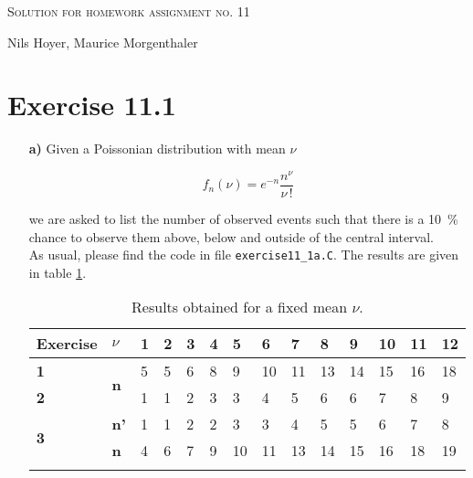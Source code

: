 \documentclass[10pt]{article}
\newenvironment{myfont}{\fontfamily{put}\selectfont}{\par}
\begin{document}
\begin{myfont}

\begin{center}
  \begin{Large}
    \textsc{Solution for homework assignment no. 11} \\
  \end{Large}
  \vspace*{0.4cm}
    Nils Hoyer, Maurice Morgenthaler
  \vspace*{1cm}
\end{center}

\section*{Exercise 11.1}

\begin{itemize}
	\item[\textbf{a)}] Given a Poissonian distribution with mean $\nu$
	
	\begin{equation}
		f_{n}(\nu) = e^{-n}\frac{n^{\nu}}{\nu\,!}
	\end{equation}

	\noindent we are asked to list the number of observed events such that there is a \SI{10}{\percent} chance to observe them above, below and outside of the central interval. \\
	As usual, please find the code in file \texttt{exercise11\_1a.C}.
	The results are given in table \ref{tab:ex1_results_a}.

	\begin{longtable}{*{14}l}
		\endfirsthead
		\endhead
		\toprule
		\textbf{Exercise} & \textbf{$\nu$} & 1 & 2 & 3 & 4 & 5 & 6 & 7 & 8 & 9 & 10 & 11 & 12 \\
		\midrule
		\textbf{1}                  & \multirow{2}{*}{\textbf{n}} & 5 & 5 & 6 & 8 & 9  & 10 & 11 & 13 & 14 & 15 & 16 & 18 \\ \cline{3-14}
		\textbf{2}                  &                             & 1 & 1 & 2 & 3 & 3  & 4  & 5  & 6  & 6  & 7  & 8  & 9  \\ \cline{2-14}
		\multirow{2}{*}{\textbf{3}} & \textbf{n'}                 & 1 & 1 & 2 & 2 & 3  & 3  & 4  & 5  & 5  & 6  & 7  & 8  \\ \cline{3-14}
		                            & \textbf{n}                  & 4 & 6 & 7 & 9 & 10 & 11 & 13 & 14 & 15 & 16 & 18 & 19 \\
		\bottomrule
		\caption[]{Results obtained for a fixed mean $\nu$.}
		\label{tab:ex1_results_a}
	\end{longtable}


\end{itemize}
\end{myfont}
\end{document}
